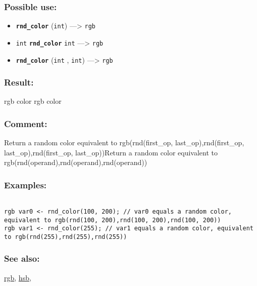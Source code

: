 \documentclass[]{book}
\providecommand{\tightlist}{%
  \setlength{\itemsep}{0pt}\setlength{\parskip}{0pt}}
\theoremstyle{definition}
\theoremstyle{definition}
\theoremstyle{definition}
\theoremstyle{remark}
\begin{document}
\subsubsection{Possible use:}\label{possible-use-443}

\begin{itemize}
\tightlist
\item
  \textbf{\texttt{rnd\_color}} (\texttt{int}) ---\textgreater{}
  \texttt{rgb}
\item
  \texttt{int} \textbf{\texttt{rnd\_color}} \texttt{int}
  ---\textgreater{} \texttt{rgb}
\item
  \textbf{\texttt{rnd\_color}} (\texttt{int} , \texttt{int})
  ---\textgreater{} \texttt{rgb}
\end{itemize}

\subsubsection{Result:}\label{result-429}

rgb color rgb color

\subsubsection{Comment:}\label{comment-86}

Return a random color equivalent to rgb(rnd(first\_op,
last\_op),rnd(first\_op, last\_op),rnd(first\_op, last\_op))Return a
random color equivalent to rgb(rnd(operand),rnd(operand),rnd(operand))

\subsubsection{Examples:}\label{examples-304}

\begin{verbatim}
 
rgb var0 <- rnd_color(100, 200); // var0 equals a random color, equivalent to rgb(rnd(100, 200),rnd(100, 200),rnd(100, 200)) 
rgb var1 <- rnd_color(255); // var1 equals a random color, equivalent to rgb(rnd(255),rnd(255),rnd(255))
\end{verbatim}

\subsubsection{See also:}\label{see-also-178}

\href{OperatorsNR\#rgb}{rgb}, \href{OperatorsDH\#hsb}{hsb},
\end{document}
